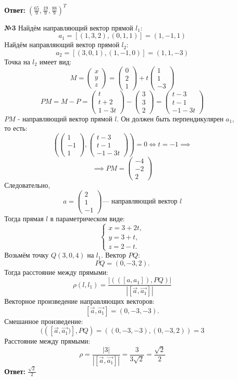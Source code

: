 \documentclass[a4paper]{article}
\newcommand{\mat}[1]{\begin{pmatrix} #1 \end{pmatrix}}
\newcommand{\lr}{\Leftrightarrow}
\renewcommand{\l}{\left(}
\renewcommand{\r}{\right)}
\begin{document}
\begin{enumerate}
    \textbf{Ответ: } $(\frac{65}{9}, \frac{19}{9}, \frac{88}{9})^T$\\

    \item[\textbf{№3}]Найдём направляющий вектор прямой $l_1$:
    $$a_1 = [(1 ,3, 2), (0, 1, 1)] = (1, -1, 1)$$
    Найдём направляющий вектор прямой $l_2$:
    $$a_2 = [(3, 0, 1), (1, -1, 0)] = (1, 1, -3)$$
    Точка на $l_2$ имеет вид:
    $$ M = \mat{x\\ y\\ z} = \begin{pmatrix} 0 \\ 2 \\ 1 \end{pmatrix} + t \begin{pmatrix} 1 \\ 1 \\ -3 \end{pmatrix}$$
    $$PM = M - P = \begin{pmatrix} t \\ t + 2 \\ 1 - 3t \end{pmatrix} - \mat{3\\3\\2} = \begin{pmatrix} t - 3 \\ t - 1 \\ -1 - 3t \end{pmatrix}$$
    $PM$ - направляющий вектор прямой $l$. Он должен быть перпендикулярен $a_1$, то есть:
    $$\l \mat{1\\-1\\1},  \begin{pmatrix} t - 3 \\ t - 1 \\ -1 - 3t \end{pmatrix}\r = 0 \lr t=-1 \implies$$
    $$\implies PM = \mat{-4\\-2\\2}$$
    Следовательно,
    $$a = \mat{2\\1\\-1} \text{--- направляющий вектор $l$}$$
    Тогда прямая \( l \) в параметрическом виде:  
    \[
    \begin{cases}
    x = 3 + 2t, \\
    y = 3 + t, \\
    z = 2 - t.
    \end{cases}
    \]
    Возьмём точку \( Q(3, 0, 4) \) на \( l_1 \). Вектор \( PQ \):
    \[
    PQ = (0, -3, 2).
    \]
    Тогда расстояние между прямыми:
    \[
    \rho(l, l_1) = \frac{\left| (\left( [a, a_1] \right) , PQ) \right|}{\left| [\vec{a} , \vec{a_1}] \right|}
    \]
    Векторное произведение направляющих векторов:
    \[
    [\vec{a}, \vec{a_1} ]= (0, -3, -3).
    \]   
    Смешанное произведение:
    \[
    (([\vec{a}, \vec{a_1})], PQ) = ((0, -3, -3), (0, -3, 2) )= 3
    \]
    Расстояние между прямыми:
    \[
    \rho = \frac{|3|}{|[\vec{a}, \vec{a_1}]|} = \frac{3}{3\sqrt{2}} = \frac{\sqrt{2}}{2}
    \]
    \textbf{Ответ: } $\frac{\sqrt{2}}{2}$



\end{enumerate}
\end{document}
